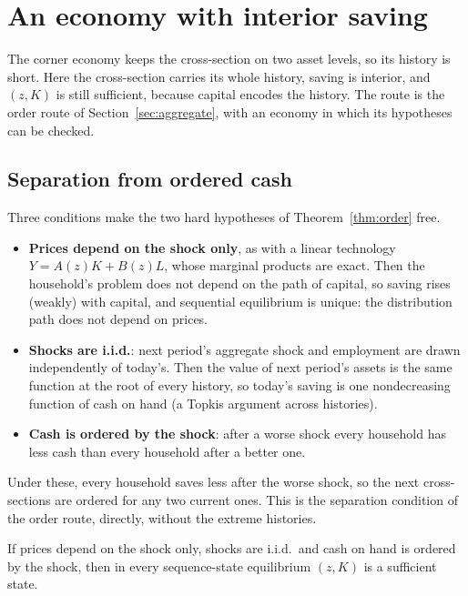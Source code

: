 \section{An economy with interior saving}\label{sec:interior}

The corner economy keeps the cross-section on two asset levels, so its history is short. Here the
cross-section carries its whole history, saving is interior, and $(z,K)$ is still sufficient,
because capital encodes the history. The route is the order route of Section~\ref{sec:aggregate},
with an economy in which its hypotheses can be checked.

\subsection{Separation from ordered cash}

Three conditions make the two hard hypotheses of Theorem~\ref{thm:order} free.
\begin{itemize}[leftmargin=*,itemsep=2pt]
\item \textbf{Prices depend on the shock only}, as with a linear technology $Y=A(z)K+B(z)L$, whose
  marginal products are exact. Then the household's problem does not depend on the path of
  capital, so saving rises (weakly) with capital, and sequential equilibrium is unique: the
  distribution path does not depend on prices.
\item \textbf{Shocks are i.i.d.}: next period's aggregate shock and employment are drawn
  independently of today's. Then the value of next period's assets is the same function at the
  root of every history, so today's saving is one nondecreasing function of cash on hand (a
  Topkis argument across histories).
\item \textbf{Cash is ordered by the shock}: after a worse shock every household has less cash than
  every household after a better one.
\end{itemize}
Under these, every household saves less after the worse shock, so the next cross-sections are
ordered for any two current ones. This is the separation condition of the order route, directly,
without the extreme histories.

\begin{theorem}\label{thm:orderedcash}
If prices depend on the shock only, shocks are i.i.d.\ and cash on hand is ordered by the shock,
then in every sequence-state equilibrium $(z,K)$ is a sufficient state.
\end{theorem}

